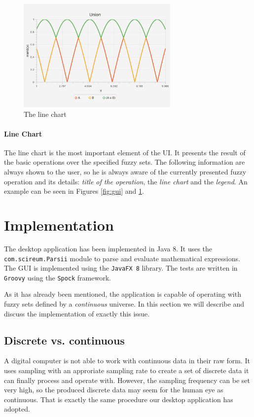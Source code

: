 \documentclass[12pt,a4paper,titlepage,final]{article}
\begin{document}
\noindent
\begin{figure}[!h]
\centering
\includegraphics[width=0.7\textwidth]{img/line-chart}
\caption{The line chart}
\label{fig:lineChart}
\end{figure}

\paragraph{Line Chart}
The line chart is the most important element of the UI. It presents the result of the basic operations over the specified fuzzy sets. The following information are always shown to the user, so he is always aware of the currently presented fuzzy operation and its details: \textit{title of the operation}, the \textit{line chart} and the \textit{legend}. An example can be seen in Figures \ref{fig:gui} and \ref{fig:lineChart}.
\section{Implementation} \label{implementation}
The desktop application has been implemented in Java 8. It uses the \texttt{com.scireum.Parsii} module to parse and evaluate mathematical expressions. The GUI is implemented using the \texttt{JavaFX 8} library. The tests are written in \texttt{Groovy} using the \texttt{Spock} framework. 

As it has already been mentioned, the application is capable of operating with fuzzy sets defined by a \textit{continuous} universe. In this section we will describe and discuss the implementation of exactly this issue.

\subsection{Discrete vs. continuous}
A digital computer is not able to work with continuous data in their raw form. It uses sampling with an approriate sampling rate to create a set of discrete data it can finally process and operate with. However, the sampling frequency can be set very high, so the produced discrete data may seem for the human eye as continuous. That is exactly the same procedure our desktop application has adopted.
\end{document}
